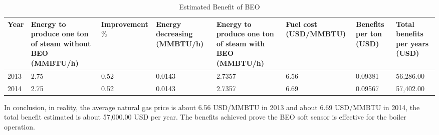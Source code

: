 \begin{table}[h!]
\scriptsize
  \begin{center}
    \begin{tabular}{p{0.5cm} p{1.5cm} p{1.5cm} p{1.5cm} p{1.5cm} p{1.8cm} p{1.2cm} p{1.2cm}}
    \toprule
    \multirow{2}{*}{Year} & Energy to produce one ton of steam without BEO (MMBTU/h) & Improvement $\%$ & Energy decreasing (MMBTU/h) &  Energy to produce one ton of steam with BEO (MMBTU/h) & Fuel cost (USD/MMBTU) & Benefits per ton (USD) & Total benefits per years (USD) \\[0.2cm]
    \midrule
    2013 & 2.75 & 0.52 & 0.0143 & 2.7357 & 6.56 & 0.09381 & 56,286.00\\
	2014 & 2.75 & 0.52 & 0.0143 & 2.7357 & 6.69 & 0.09567 & 57,402.00\\
	\bottomrule		
	\end{tabular}
    \caption{Estimated Benefit of BEO}
    \label{chap05:table01} 
  \end{center} 
\end{table}

In conclusion, in reality, the average natural gas price is about 6.56 USD/MMBTU in 2013 and about 6.69 USD/MMBTU in 2014, the total benefit estimated is about 57,000.00 USD per year. The benefits achieved prove the BEO soft sensor is effective for the boiler operation.

